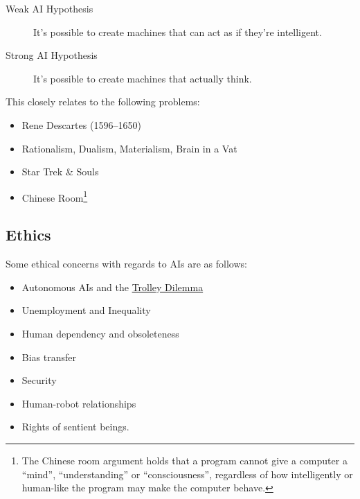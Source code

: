 \begin{description}
    \item[Weak AI Hypothesis] It's possible to create machines that can act as if they're intelligent.
    \item[Strong AI Hypothesis] It's possible to create machines that actually think.
\end{description}

This closely relates to the following problems:

\begin{itemize}
    \item Rene Descartes (1596--1650)
    \item Rationalism, Dualism, Materialism, Brain in a Vat
    \item Star Trek \& Souls
    \item Chinese Room\footnote{The Chinese room argument holds that a program cannot give a computer a ``mind'', ``understanding'' or ``consciousness'', regardless of how intelligently or human-like the program may make the computer behave.}
\end{itemize}

\subsection{Ethics}
Some ethical concerns with regards to AIs are as follows:
\begin{itemize}
    \item Autonomous AIs and the \href{http://www.trolleydilemma.com/}{Trolley Dilemma}
    \item Unemployment and Inequality
    \item Human dependency and obsoleteness
    \item Bias transfer
    \item Security
    \item Human-robot relationships
    \item Rights of sentient beings.
\end{itemize}

